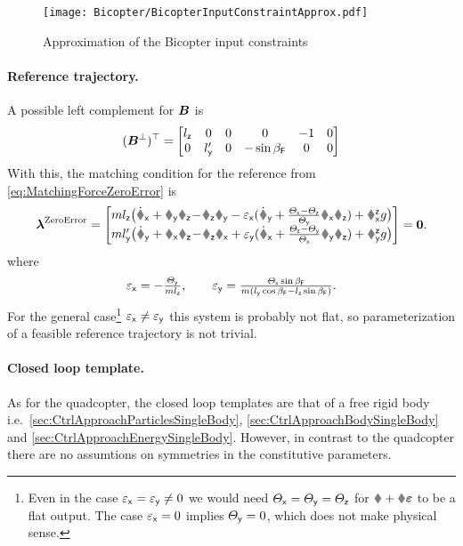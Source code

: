 \begin{figure}[ht]
 \centering
 \texttt{[image: Bicopter/BicopterInputConstraintApprox.pdf]}
 \caption{Approximation of the Bicopter input constraints}
 \label{fig:BicopterInputConstraintApprox}
\end{figure}

\paragraph{Reference trajectory.}
A possible left complement for $\boldsymbol{B}$ is
\begin{align}
 (\boldsymbol{B}^\bot)^\top = \begin{bmatrix} l_{\mathsf{z}} & 0 & 0 & 0 & -1 & 0 \\ 0 & l_{\mathsf{y}}' & 0 & -\sin\beta_{\mathsf{F}} & 0 & 0 \end{bmatrix}
\end{align}
With this, the matching condition for the reference from \eqref{eq:MatchingForceZeroError} is
\begin{align}
 \tuple{\lambda}^{\text{ZeroError}} = 
 \begin{bmatrix} 
  m \PropPosZ  \big( \vxd + \vy\wz \!-\! \vz\wy - \epsx (\wyd + \tfrac{\Jx-\Jz}{\Jy} \wx\wz) + \Rzx\gravityAccConst \big)  \\
  m \PropPosY' \big( \vyd + \vx\wz \!-\! \vz\wx + \epsy (\wxd + \tfrac{\Jz-\Jy}{\Jx} \wy\wz) + \Rzy\gravityAccConst \big)
 \end{bmatrix}
 = \tuple{0}
 .
\end{align}
where
\begin{align}
 \varepsilon_{\mathsf{x}} = -\tfrac{\varTheta_{\mathsf{y}}}{m l_{\mathsf{z}}},
\qquad
 \varepsilon_{\mathsf{y}} = \tfrac{\varTheta_{\mathsf{x}} \sin\beta_{\mathsf{F}}}{m (l_{\mathsf{y}} \cos\beta_{\mathsf{F}} - l_{\mathsf{z}} \sin\beta_{\mathsf{F}})}.
\end{align}
For the general case\footnote{Even in the case $\varepsilon_{\mathsf{x}}=\varepsilon_{\mathsf{y}}\neq0$ we would need $\varTheta_{\mathsf{x}}=\varTheta_{\mathsf{y}}=\varTheta_{\mathsf{z}}$ for $\r+\R \tuple{\eps}$ to be a flat output. The case $\varepsilon_{\mathsf{x}}=0$ implies $\varTheta_{\mathsf{y}}=0$, which does not make physical sense.} 
$\varepsilon_{\mathsf{x}}\neq\varepsilon_{\mathsf{y}}$ this system is probably not flat, so parameterization of a feasible reference trajectory is not trivial.

\paragraph{Closed loop template.}
As for the quadcopter, the closed loop templates are that of a free rigid body i.e.\ \autoref{sec:CtrlApproachParticlesSingleBody}, \autoref{sec:CtrlApproachBodySingleBody} and \autoref{sec:CtrlApproachEnergySingleBody}.
However, in contrast to the quadcopter there are no assumtions on symmetries in the constitutive parameters.

